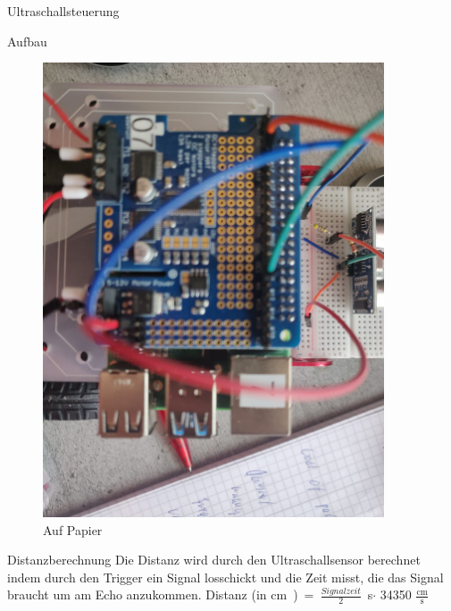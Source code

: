 \documentclass[12pt,twoside]{report}
\begin{document}
\begin{section}{Ultraschallsteuerung}
\begin{subsection}{Aufbau}
\begin{figure}
\begin{minipage}{0.45\textwidth}
                \includegraphics[width=0.9\textwidth]{lernportfolio_assets/Schaltplan_Ultraschallsensor2} %
                \caption{Auf Papier}
            \end{minipage}
        \end{figure}
    \end{subsection}
    \begin{subsection}{Distanzberechnung}
        Die Distanz wird durch den Ultraschallsensor berechnet indem durch den Trigger ein Signal losschickt und die Zeit misst, die das Signal braucht um am Echo anzukommen. 
        Distanz (in \si\cm)= \( \frac{Signalzeit}{2} \) \si\second $ \cdot $ 34350 \( \frac{\si\cm}{\si\second} \)
    \end{subsection}

\end{section}
\end{document}
